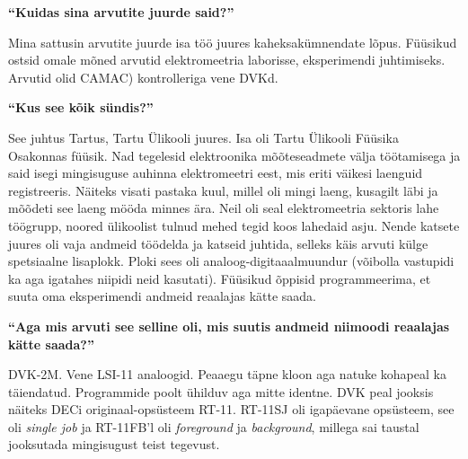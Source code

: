 
\textbf{\enquote{Kuidas sina arvutite juurde said?}}

Mina sattusin arvutite juurde isa töö juures kaheksakümnendate lõpus. Füüsikud ostsid omale mõned arvutid elektromeetria laborisse, eksperimendi juhtimiseks. Arvutid olid CAMAC) kontrolleriga vene DVKd.

\textbf{\enquote{Kus see kõik sündis?}}

See juhtus Tartus, Tartu Ülikooli juures. Isa oli Tartu Ülikooli Füüsika Osakonnas füüsik. Nad tegelesid elektroonika mõõteseadmete välja töötamisega ja said isegi mingisuguse auhinna elektromeetri eest, mis eriti väikesi laenguid registreeris. Näiteks visati pastaka kuul, millel oli mingi laeng, kusagilt läbi ja mõõdeti see laeng mööda minnes ära. Neil oli seal elektromeetria sektoris lahe töögrupp, noored ülikoolist tulnud mehed tegid koos lahedaid asju. Nende katsete juures oli vaja andmeid töödelda ja katseid juhtida, selleks käis arvuti külge spetsiaalne lisaplokk. Ploki sees oli analoog-digitaaalmuundur (võibolla vastupidi ka aga igatahes niipidi neid kasutati). Füüsikud õppisid programmeerima, et suuta oma eksperimendi andmeid reaalajas kätte saada. 

\textbf{\enquote{Aga mis arvuti see selline oli, mis suutis andmeid niimoodi reaalajas kätte saada?}}

DVK-2M. Vene LSI-11 analoogid. Peaaegu täpne kloon aga natuke kohapeal ka täiendatud. Programmide poolt ühilduv aga mitte identne. DVK peal jooksis näiteks DECi originaal-opsüsteem RT-11. RT-11SJ oli igapäevane opsüsteem, see oli \emph{single job} ja RT-11FB'l oli \emph{foreground} ja \emph{background}, millega sai taustal jooksutada mingisugust teist tegevust. 

